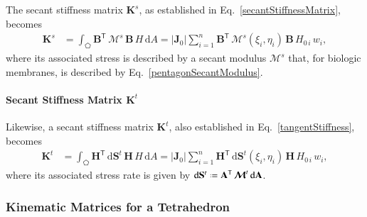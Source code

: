 The secant stiffness matrix $\mathbf{K}^s$, as established in Eq.~\ref{secantStiffnessMatrix}, becomes
\begin{equation}
	\begin{aligned}
		\mathbf{K}^s & =\int_{\pentagon} \mathbf{B}^{\mathsf{T}} \,  \boldsymbol{\mathcal{M}}^s \, \mathbf{B}  \, H \,  \mathrm{d} A
		= |\mathbf{J}_0| \sum_{i=1}^{n}  \mathbf{B}^{\mathsf{T}} \, \boldsymbol{\mathcal{M}}^s (\xi_i, \eta_i) \, \mathbf{B} \, H_{0\,i} \, w_i ,
	\end{aligned}
\end{equation} 
where its associated stress is described by a secant modulus $\boldsymbol{\mathcal{M}}^{s}$ that, for biologic membranes, is described by Eq.~\ref{pentagonSecantModulus}.


\paragraph{Secant Stiffness Matrix $\mathbf{K}^t$}

Likewise, a secant stiffness matrix $\mathbf{K}^t$, also established in Eq.~\ref{tangentStiffness}, becomes 
\begin{equation}
	\begin{aligned}
		\mathbf{K}^t & = \int_{\pentagon} \mathbf{H}^{\mathsf{T}} \,  \mathrm{d} \mathbf{S}^t \, \mathbf{H}  \, H \,  \mathrm{d} A
		= | \mathbf{J}_0 | \sum_{i=1}^{n}  \mathbf{H}^{\mathsf{T}} \,  \mathrm{d} \mathbf{S}^t (\xi_i, \eta_i) \, \mathbf{H} \, H_{0\,i} \, w_i ,
	\end{aligned}
\end{equation}
where its associated stress rate is given by $\mathrm{d} \mathbf{S}^t \defeq \mathbf{A}^{\mathsf{T}} \, \boldsymbol{\mathcal{M}}^t \, \mathrm{d} \mathbf{A}$.

\subsubsection{Kinematic Matrices for a Tetrahedron}

